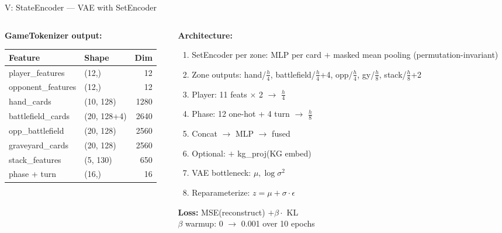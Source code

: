\documentclass[aspectratio=169, 10pt]{beamer}
\begin{document}
\begin{frame}{V: StateEncoder --- VAE with SetEncoder}
  \begin{columns}[T]
    \begin{column}{0.55\textwidth}
      \footnotesize
      \textbf{GameTokenizer output:}
      \begin{center}
      \begin{tabular}{@{}llr@{}}
        \toprule
        \textbf{Feature} & \textbf{Shape} & \textbf{Dim} \\
        \midrule
        player\_features   & (12,)       & 12 \\
        opponent\_features  & (12,)       & 12 \\
        hand\_cards         & (10, 128)   & 1280 \\
        battlefield\_cards  & (20, 128+4) & 2640 \\
        opp\_battlefield    & (20, 128)   & 2560 \\
        graveyard\_cards    & (20, 128)   & 2560 \\
        stack\_features     & (5, 130)    & 650 \\
        phase + turn        & (16,)       & 16 \\
        \bottomrule
      \end{tabular}
      \end{center}
    \end{column}
    \begin{column}{0.42\textwidth}
      \footnotesize
      \textbf{Architecture:}
      \begin{enumerate}\scriptsize
        \item SetEncoder per zone: MLP per card $+$ masked mean pooling (permutation-invariant)
        \item Zone outputs: hand/$\frac{h}{4}$, battlefield/$\frac{h}{4}$+4, opp/$\frac{h}{4}$, gy/$\frac{h}{8}$, stack/$\frac{h}{8}$+2
        \item Player: 11 feats $\times$ 2 $\to$ $\frac{h}{4}$
        \item Phase: 12 one-hot + 4 turn $\to$ $\frac{h}{8}$
        \item Concat $\to$ MLP $\to$ fused
        \item Optional: $+$ kg\_proj(KG embed)
        \item VAE bottleneck: $\mu, \log\sigma^2$
        \item Reparameterize: $z = \mu + \sigma \cdot \epsilon$
      \end{enumerate}
      \vspace{0.1cm}
      \textbf{Loss:} MSE(reconstruct) $+ \beta \cdot$ KL\\
      $\beta$ warmup: 0 $\to$ 0.001 over 10 epochs
    \end{column}
  \end{columns}
\end{frame}
\end{document}
